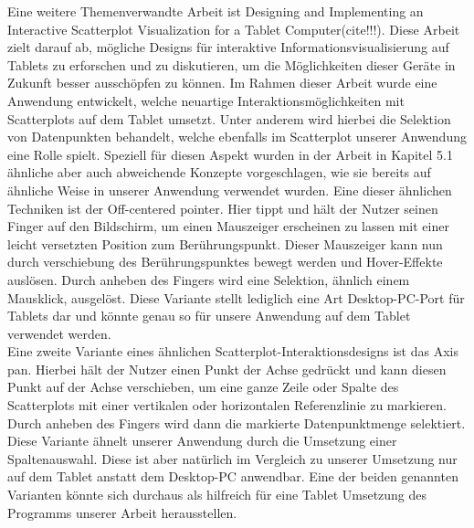 \documentclass[usegeometry=true]{scrartcl}
\begin{document}
Eine weitere Themenverwandte Arbeit ist \glqq Designing and Implementing an Interactive Scatterplot Visualization for a Tablet Computer\grqq (cite!!!). Diese Arbeit zielt darauf ab, mögliche Designs für interaktive Informationsvisualisierung auf Tablets zu erforschen und zu diskutieren, um die Möglichkeiten dieser Geräte in Zukunft besser ausschöpfen zu können. Im Rahmen dieser Arbeit wurde eine Anwendung entwickelt, welche neuartige Interaktionsmöglichkeiten mit Scatterplots auf dem Tablet umsetzt. Unter anderem wird hierbei die Selektion von Datenpunkten behandelt, welche ebenfalls im Scatterplot unserer Anwendung eine Rolle spielt. Speziell für diesen Aspekt wurden in der Arbeit in Kapitel 5.1 ähnliche aber auch abweichende Konzepte vorgeschlagen, wie sie bereits auf ähnliche Weise in unserer Anwendung verwendet wurden. Eine dieser ähnlichen Techniken ist der \glqq Off-centered pointer\grqq. Hier tippt und hält der Nutzer seinen Finger auf den Bildschirm, um einen Mauszeiger erscheinen zu lassen mit einer leicht versetzten Position zum Berührungspunkt. Dieser Mauszeiger kann nun durch verschiebung des Berührungspunktes bewegt werden und Hover-Effekte auslösen. Durch anheben des Fingers wird eine Selektion, ähnlich einem Mausklick, ausgelöst. Diese Variante stellt lediglich eine Art Desktop-PC-Port für Tablets dar und könnte genau so für unsere Anwendung auf dem Tablet verwendet werden.\\ Eine zweite Variante eines ähnlichen Scatterplot-Interaktionsdesigns ist das \glqq Axis pan\grqq. Hierbei hält der Nutzer einen Punkt der Achse gedrückt und kann diesen Punkt auf der Achse verschieben, um eine ganze Zeile oder Spalte des Scatterplots mit einer vertikalen oder horizontalen Referenzlinie zu markieren. Durch anheben des Fingers wird dann die markierte Datenpunktmenge selektiert. Diese Variante ähnelt unserer Anwendung durch die Umsetzung einer Spaltenauswahl. Diese ist aber natürlich im Vergleich zu unserer Umsetzung nur auf dem Tablet anstatt dem Desktop-PC anwendbar. Eine der beiden genannten Varianten könnte sich durchaus als hilfreich für eine Tablet Umsetzung des Programms unserer Arbeit herausstellen.\\
\end{document}
